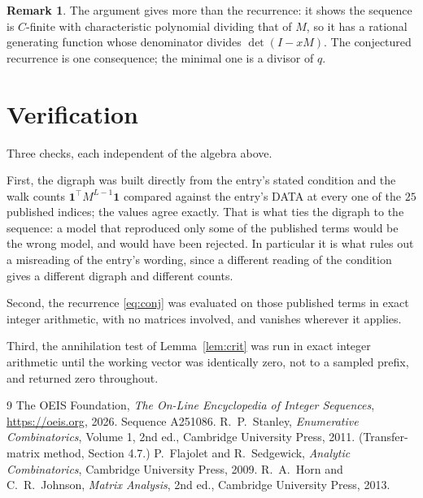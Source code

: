 \documentclass[11pt,a4paper]{article}
\theoremstyle{plain}
\theoremstyle{definition}
\newtheorem{remark}[theorem]{Remark}
\begin{document}
\begin{remark}
The argument gives more than the recurrence: it shows the sequence is $C$-finite with
characteristic polynomial dividing that of $M$, so it has a rational generating function
whose denominator divides $\det(I-xM)$. The conjectured recurrence is one consequence; the
minimal one is a divisor of $q$.
\end{remark}

\section{Verification}

Three checks, each independent of the algebra above.

First, the digraph was built directly from the entry's stated condition and the walk counts
$\mathbf{1}^{\!\top}M^{L-1}\mathbf{1}$ compared against the entry's DATA at
every one of the $25$ published indices; the values agree exactly. That is what ties
the digraph to the sequence: a model that reproduced only some of the published terms would
be the wrong model, and would have been rejected. In particular it is what rules out a
misreading of the entry's wording, since a different reading of the condition gives a
different digraph and different counts.

Second, the recurrence \eqref{eq:conj} was evaluated on those published terms in exact
integer arithmetic, with no matrices involved, and vanishes wherever it applies.

Third, the annihilation test of Lemma~\ref{lem:crit} was run in exact integer arithmetic
until the working vector was identically zero, not to a sampled prefix, and returned zero
throughout.

\begin{thebibliography}{9}
 The OEIS Foundation, \emph{The On-Line Encyclopedia of Integer
Sequences}, \url{https://oeis.org}, 2026. Sequence A251086.
 R.~P.~Stanley, \emph{Enumerative Combinatorics}, Volume 1, 2nd ed.,
Cambridge University Press, 2011. (Transfer-matrix method, Section 4.7.)
 P.~Flajolet and R.~Sedgewick, \emph{Analytic Combinatorics}, Cambridge
University Press, 2009.
 R.~A.~Horn and C.~R.~Johnson, \emph{Matrix Analysis}, 2nd ed., Cambridge
University Press, 2013.
\end{thebibliography}
\end{document}
